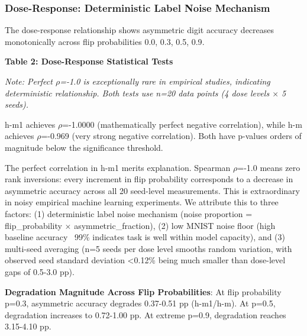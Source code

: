 \subsubsection{Dose-Response: Deterministic Label Noise Mechanism}

The dose-response relationship shows asymmetric digit accuracy decreases monotonically across flip probabilities {0.0, 0.3, 0.5, 0.9}.

\textbf{Table 2: Dose-Response Statistical Tests}

\begin{table}[htbp]
\centering
{}
\end{table}

\textit{Note: Perfect $\rho$=-1.0 is exceptionally rare in empirical studies, indicating deterministic relationship. Both tests use n=20 data points (4 dose levels $\times$ 5 seeds).}

h-m1 achieves $\rho$=-1.0000 (mathematically perfect negative correlation), while h-m achieves $\rho$=-0.969 (very strong negative correlation). Both have p-values orders of magnitude below the significance threshold.

The perfect correlation in h-m1 merits explanation. Spearman $\rho$=-1.0 means zero rank inversions: every increment in flip probability corresponds to a decrease in asymmetric accuracy across all 20 seed-level measurements. This is extraordinary in noisy empirical machine learning experiments. We attribute this to three factors: (1) deterministic label noise mechanism (noise proportion = flip\_probability $\times$ asymmetric\_fraction), (2) low MNIST noise floor (high baseline accuracy ~99\% indicates task is well within model capacity), and (3) multi-seed averaging (n=5 seeds per dose level smooths random variation, with observed seed standard deviation <0.12\% being much smaller than dose-level gaps of 0.5-3.0 pp).

\textbf{Degradation Magnitude Across Flip Probabilities}: At flip probability p=0.3, asymmetric accuracy degrades 0.37-0.51 pp (h-m1/h-m). At p=0.5, degradation increases to 0.72-1.00 pp. At extreme p=0.9, degradation reaches 3.15-4.10 pp.

